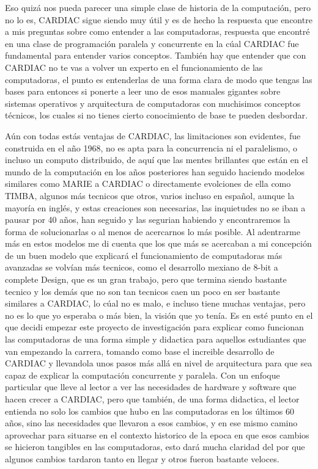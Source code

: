 \documentclass[letterpaper,12pt,oneside]{book}
\begin{document}
	Eso quizá nos pueda parecer una simple clase de historia de la computación, pero no lo es, CARDIAC sigue siendo muy útil y es de hecho la respuesta que encontre
	a mis preguntas sobre como entender a las computadoras, respuesta que encontré en una clase de programación paralela y concurrente en la cúal CARDIAC
	fue fundamental para entender varios conceptos. También hay que entender que con CARDIAC no te vas a volver un experto en el funcionamiento de las computadoras,
	el punto es entenderlas de una forma clara de modo que tengas las bases para entonces si ponerte a leer uno de esos manuales gigantes sobre sistemas
	operativos y arquitectura de computadoras con muchisimos conceptos técnicos, los cuales si no tienes cierto conocimiento de base te pueden desbordar.
	
	Aún con todas estás ventajas de CARDIAC, las limitaciones son evidentes, fue construida en el año 1968, no es apta para la concurrencia ni el paralelismo, o 
	incluso un computo distribuido, de aquí que las mentes brillantes que están en el mundo de la computación en los años posteriores han seguido haciendo
	modelos similares como MARIE a CARDIAC o directamente evolciones de ella como TIMBA, algunos más tecnicos que otros, varios incluso en español, aunque
	la mayoría en inglés, y estas creaciones son necesarias, las inquietudes no se iban a pausar por 40 años, han seguido y las segurian habiendo y encontraremos
	la forma de solucionarlas o al menos de acercarnos lo más posible. Al adentrarme más en estos modelos me di cuenta que los que más se acercaban a mi concepción
	de un buen modelo que explicará el funcionamiento de computadoras más avanzadas se volvían más tecnicos, como el desarrollo mexiano de 8-bit a complete Design, 
	que es un gran trabajo, pero que termina siendo bastante tecnico y los demás que no son tan tecnicos caen un poco en ser bastante similares a CARDIAC, lo cúal no 
	es malo, e incluso tiene muchas ventajas, pero no es lo que yo esperaba o más bien, la visión que yo tenía. Es en esté punto en el que decidi empezar este
	proyecto de investigación para explicar como funcionan las computadoras de una forma simple y didactica para aquellos estudiantes que van empezando la carrera,
	tomando como base el increible desarrollo de CARDIAC y llevandola unos pasos más allá en nivel de arquitectura para que sea capaz de explicar
	la computación concurrente y paralela. Con un enfoque particular que lleve al lector a ver las necesidades de hardware y software que hacen crecer a CARDIAC,
	pero que también, de una forma didactica, el lector entienda no solo los cambios que hubo en las computadoras en los últimos 60 años, sino
	las necesidades que llevaron a esos cambios, y en ese mismo camino aprovechar para situarse en el contexto historico de la epoca en que esos
	cambios se hicieron tangibles en las computadoras, esto dará mucha claridad del por que algunos cambios tardaron tanto en llegar y otros fueron bastante veloces.
	
\end{document}
